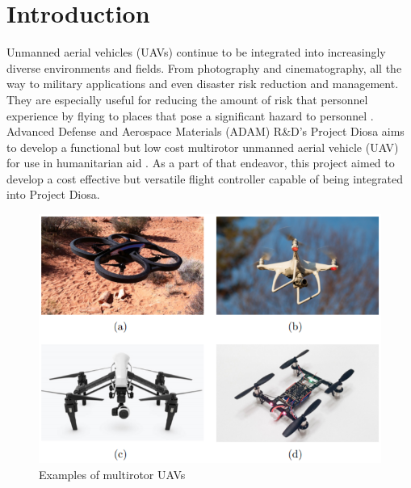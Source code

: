 \documentclass[english]{upeeei}
\begin{document}
\begin{frontmatter}
\setlength{\parskip}{0pt}
\tableofcontents
\listoffigures
\end{frontmatter}
\def\MASTERDOC{true}

\chapter{Introduction}
Unmanned aerial vehicles (UAVs) continue to be integrated into increasingly diverse environments and
fields. From photography and cinematography, all the way to military applications and even disaster risk reduction and 
management. They are especially useful for reducing the amount of risk that personnel experience by flying to places that 
pose a significant hazard to personnel \cite{ICNSC2010}. Advanced Defense and Aerospace Materials (ADAM) R\&D's Project
Diosa aims to develop a functional but low cost multirotor unmanned aerial vehicle (UAV) for use in humanitarian aid
\cite{diosa2020}. As a part of that endeavor, this project aimed to develop a cost effective but versatile flight 
controller capable of being integrated into Project Diosa.
\begin{figure}[h]
    \centering
    \includegraphics[scale=0.5]{images/droneExamples.PNG}
    \caption{Examples of multirotor UAVs \cite{zimmerman2016}}
    \label{fig:droneExamples}
\end{figure}
\end{document}
